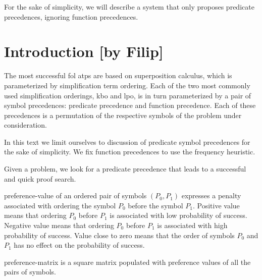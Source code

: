 For the sake of simplicity,
we will describe a system that only proposes predicate precedences, ignoring function precedences.

\newpage

\section{Introduction [by Filip]}

The most successful \gls{fol} \glspl{atp} are based on superposition calculus,
which is parameterized by simplification term ordering.
Each of the two most commonly used simplification orderings, \gls{kbo} and \gls{lpo},
is in turn parameterized by a pair of symbol precedences:
predicate precedence and function precedence.
Each of these precedences is a permutation of the respective symbols of the problem under consideration.

In this text we limit ourselves to discussion of predicate symbol precedences for the sake of simplicity.
We fix function precedences to use the frequency heuristic.

Given a problem, we look for a predicate \gls{precedence} that leads to a successful and quick proof search.

\Gls{preference-value} of an ordered pair of symbols \((P_0, P_1)\) expresses a penalty associated with ordering the symbol \(P_0\) before the symbol \(P_1\).
Positive value means that ordering \(P_0\) before \(P_1\) is associated with low probability of success.
Negative value means that ordering \(P_0\) before \(P_1\) is associated with high probability of success.
Value close to zero means that the order of symbols \(P_0\) and \(P_1\) has no effect on the probability of success.

\Gls{preference-matrix} is a square matrix populated with preference values of all the pairs of symbols.

